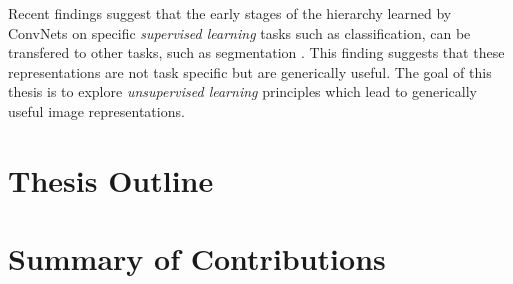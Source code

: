Recent findings suggest that the early stages of the hierarchy learned by ConvNets 
on specific \emph{supervised learning} tasks such as classification, can be transfered 
to other tasks, such as segmentation \cite{yosinski2014}. This finding suggests 
that these representations are not task specific but are generically useful. 
The goal of this thesis is to explore \emph{unsupervised learning} principles which lead
to generically useful image representations.    

\section{Thesis Outline} 
\section{Summary of Contributions} 





